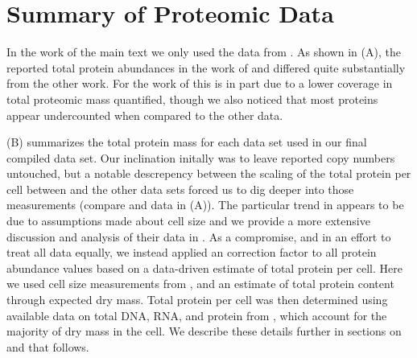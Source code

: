 \section{Summary of Proteomic Data}
\label{sec:SI_data_summary}
In the work of the main text we only used the data from \cite{valgepea2013,
li2014, peebo2015, schmidt2016}. As shown in (A), the
reported total protein abundances in the work of \cite{taniguchi2010} and
\cite{soufi2015} differed quite substantially from the other work. For the work
of \cite{taniguchi2010} this is in part due to a lower coverage in total
proteomic mass quantified, though we also noticed that most proteins appear
undercounted when compared to the other data.

(B) summarizes the total protein mass for each data
set used in our final compiled data set. Our inclination initally was to
leave reported copy numbers untouched, but a notable descrepency between the scaling
of the total protein per cell between \cite{schmidt2016} and the other data sets
forced us to dig deeper into those measurements (compare \cite{schmidt2016} and
\cite{li2014} data in (A)). The particular trend in
\cite{schmidt2016} appears to be due to assumptions made about cell size and we
provide a more extensive discussion and analysis of their data in
. As a compromise, and in an effort to treat all data
equally, we instead applied an correction factor to all protein abundance values
based on a data-driven estimate of total protein per cell. Here we used cell
size measurements from \cite{si2017, si2019}, and an estimate of total protein
content through expected dry mass. Total protein per cell was then determined
using available data on total DNA, RNA, and protein from \cite{basan2015,
dai2016}, which  account for the majority of dry mass in the cell. We describe
these details further in sections  on  and
 that follows.

